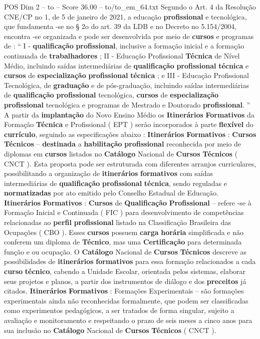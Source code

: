 \begin{textsample}{POS Dim 2 – to – Score 36.00 – to/to\_em\_64.txt}
Segundo o Art. 4 da Resolução CNE/CP no 1, de 5 de janeiro de 2021, a educação \textbf{profissional} e tecnológica, que fundamenta -se no § 2o do art. 39 da LDB e no Decreto no 5.154/2004, encontra -se organizada e pode ser desenvolvida por meio de \textbf{cursos} e programas de : “ I - \textbf{qualificação} \textbf{profissional}, inclusive a formação inicial e a formação continuada de \textbf{trabalhadores} ; II - Educação Profissional \textbf{Técnica} de Nível Médio, incluindo saídas intermediárias de \textbf{qualificação} \textbf{profissional} \textbf{técnica} e \textbf{cursos} de \textbf{especialização} \textbf{profissional} \textbf{técnica} ; e III - Educação Profissional Tecnológica, de \textbf{graduação} e de pós-graduação, incluindo saídas intermediárias de \textbf{qualificação} \textbf{profissional} tecnológica, \textbf{cursos} de \textbf{especialização} \textbf{profissional} tecnológica e programas de Mestrado e Doutorado \textbf{profissional}. ” A partir da \textbf{implantação} do Novo Ensino Médio os \textbf{Itinerários} \textbf{Formativos} da Formação \textbf{Técnica} e Profissional ( EPT ) serão incorporados à parte \textbf{flexível} do \textbf{currículo}, seguindo as especificações abaixo : \textbf{Itinerários} \textbf{Formativos} : \textbf{Cursos} \textbf{Técnicos} – \textbf{destinada} a \textbf{habilitação} \textbf{profissional} reconhecida por meio de diplomas em \textbf{cursos} listados no \textbf{Catálogo} Nacional de \textbf{Cursos} \textbf{Técnicos} ( CNCT ).
Esta proposta pode ser estruturada com diferentes arranjos curriculares, possibilitando a organização de \textbf{itinerários} \textbf{formativos} com saídas intermediárias de \textbf{qualificação} \textbf{profissional} \textbf{técnica}, sendo reguladas e \textbf{normatizadas} por ato emitido pelo Conselho Estadual de Educação. \textbf{Itinerários} \textbf{Formativos} : \textbf{Cursos} de \textbf{Qualificação} \textbf{Profissional} – refere -se à Formação Inicial e Continuada ( FIC ) para desenvolvimento de competências relacionadas ao \textbf{perfil} \textbf{profissional} listado na Classificação Brasileira das Ocupações ( CBO ).
Esses \textbf{cursos} possuem \textbf{carga} \textbf{horária} simplificada e não conferem um diploma de \textbf{Técnico}, mas uma \textbf{Certificação} para determinada função e ou ocupação.
O \textbf{Catálogo} Nacional de \textbf{Cursos} \textbf{Técnicos} descreve as possibilidades de \textbf{itinerários} \textbf{formativos} para essa formação relacionados a cada \textbf{curso} \textbf{técnico}, cabendo a Unidade Escolar, orientada pelos sistemas, elaborar seus projetos e planos, a partir dos instrumentos de diálogo e dos \textbf{preceitos} já citados. \textbf{Itinerários} \textbf{Formativos} : Formações Experimentais – são formações experimentais ainda não reconhecidas formalmente, que podem ser classificadas como experimentos pedagógicos, a ser tratados de forma singular, sujeito a avaliação e monitoramento e respeitando o prazo de seis meses a cinco anos para sua inclusão no \textbf{Catálogo} Nacional de \textbf{Cursos} \textbf{Técnicos} ( CNCT ).

\end{textsample}
